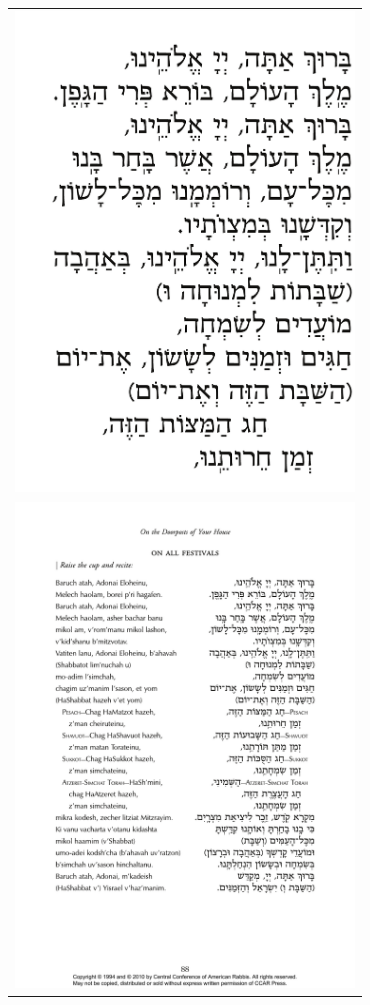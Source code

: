 \documentclass[12pt,a4wide,openany]{memoir}
\begin{document}
\begin{tabular}{r}
\includegraphics[width=9cm,trim=0 16mm 0 0]{figs/0A020-kiddush1}\\
\includegraphics[width=9cm]{figs/0A024-kiddush2}\\
\end{tabular}
\end{document}
